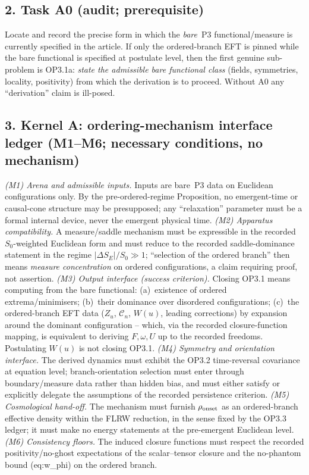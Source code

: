 \subsection*{2. Task A0 (audit; prerequisite)}
Locate and record the precise form in which the \emph{bare}~P3
functional/measure is currently specified in the article.
If only the ordered-branch EFT is pinned while the bare functional
is specified at postulate level, then the first genuine
sub-problem is OP3.1a: \emph{state the admissible bare functional
class} (fields, symmetries, locality, positivity) from which the
derivation is to proceed.
Without A0 any ``derivation'' claim is ill-posed.

\subsection*{3. Kernel A: ordering-mechanism interface ledger
(M1--M6; necessary conditions, no mechanism)}
\emph{(M1) Arena and admissible inputs.}
Inputs are bare~P3 data on Euclidean configurations only.
By the pre-ordered-regime Proposition, no emergent-time or
causal-cone structure may be presupposed; any ``relaxation''
parameter must be a formal internal device, never the emergent
physical time.
\emph{(M2) Apparatus compatibility.}
A measure/saddle mechanism must be expressible in the recorded
$S_0$-weighted Euclidean form and must reduce to the recorded
saddle-dominance statement in the regime $|\Delta S_E|/S_0\gg1$;
``selection of the ordered branch'' then means \emph{measure
concentration} on ordered configurations, a claim requiring proof,
not assertion.
\emph{(M3) Output interface (success criterion).}
Closing OP3.1 means computing from the bare functional:
(a)~existence of ordered extrema/minimisers;
(b)~their dominance over disordered configurations;
(c)~the ordered-branch EFT data ($Z_u$, $\mathcal C_n$, $W(u)$,
leading corrections) by expansion around the dominant
configuration -- which, via the recorded closure-function mapping,
is equivalent to deriving $F,\omega,U$ up to the recorded
freedoms.
Postulating $W(u)$ is not closing OP3.1.
\emph{(M4) Symmetry and orientation interface.}
The derived dynamics must exhibit the OP3.2 time-reversal
covariance at equation level; branch-orientation selection must
enter through boundary/measure data rather than hidden bias, and
must either satisfy or explicitly delegate the assumptions of the
recorded persistence criterion.
\emph{(M5) Cosmological hand-off.}
The mechanism must furnish $\rho_{\rm onset}$ as an ordered-branch
effective density within the FLRW reduction, in the sense fixed by
the OP3.3 ledger; it must make no energy statements at the
pre-emergent Euclidean level.
\emph{(M6) Consistency floors.}
The induced closure functions must respect the recorded
positivity/no-ghost expectations of the scalar--tensor closure and
the no-phantom bound (eq:w\_phi) on the ordered branch.

